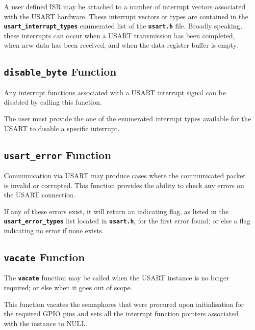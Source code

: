\documentclass[a4paper, oneside, 11pt, titlepage, onecolumn, openright]{report}
\begin{document}
					A user defined ISR may be attached to a number of interrupt vectors associated with the USART hardware. These interrupt vectors or types are contained in the \textbf{\texttt{usart\_interrupt\_types}} enumerated list of the \textbf{\texttt{usart.h}} file.	Broadly speaking, these interrupts can occur when a USART transmission has been completed, when new data has been received, and when the data register buffer is empty.
			
				\subsection{\textbf{\texttt{disable\_byte}} Function}
					\label{ss:Hardware Abstraction Libraries:usart Module:disable_byteFunction}
			
					Any interrupt functions associated with a USART interrupt signal can be disabled by calling this function.
			
The user must provide the one of the enumerated interrupt types available for the USART to disable a specific interrupt. 
			
				\subsection{\textbf{\texttt{usart\_error}} Function}
					\label{ss:Hardware Abstraction Libraries:usart Module:usart_errorFunction}
			
					Communication via USART may produce cases where the communicated packet is invalid or corrupted. This function provides the ability to check any errors on the USART connection.
			
If any of these errors exist, it will return an indicating flag, as listed in the \textbf{\texttt{usart\_error\_types}} list located in \textbf{\texttt{usart.h}}, for the first error found; or else a flag indicating no error if none exists.
			
				\subsection{\textbf{\texttt{vacate}} Function}
					\label{ss:Hardware Abstraction Libraries:usart Module:vacateFunction}
			
					The \textbf{\texttt{vacate}} function may be called when the USART instance is no longer required; or else when it goes out of scope.
			
This function vacates the semaphores that were procured upon initialisation for the required GPIO pins and sets all the interrupt function pointers associated with the instance to NULL.
\end{document}
